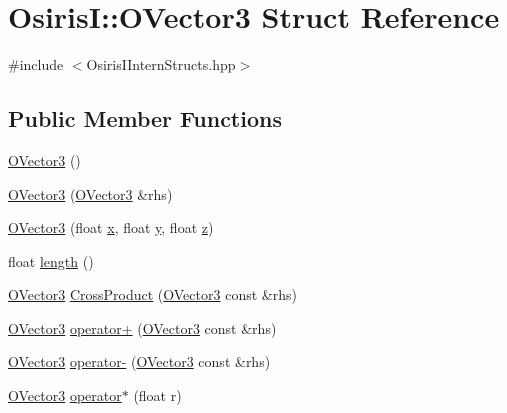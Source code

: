 \hypertarget{struct_osiris_i_1_1_o_vector3}{\section{Osiris\-I\-:\-:O\-Vector3 Struct Reference}
\label{struct_osiris_i_1_1_o_vector3}
}


{\ttfamily \#include $<$Osiris\-I\-Intern\-Structs.\-hpp$>$}

\subsection*{Public Member Functions}
\begin{DoxyCompactItemize}
\item 
\hyperlink{struct_osiris_i_1_1_o_vector3_ae9ea99bb61e223efabb6304c63caa5c9}{O\-Vector3} ()
\item 
\hyperlink{struct_osiris_i_1_1_o_vector3_ab8c2f1d7177080985eab662022b9b68e}{O\-Vector3} (\hyperlink{struct_osiris_i_1_1_o_vector3}{O\-Vector3} \&rhs)
\item 
\hyperlink{struct_osiris_i_1_1_o_vector3_a1a7728527eccb7ea5baf328e96ba1de7}{O\-Vector3} (float \hyperlink{struct_osiris_i_1_1_o_vector3_ade9127a381a17e7e24e72ea2eb213567}{x}, float \hyperlink{struct_osiris_i_1_1_o_vector3_a2973d21ed51744427fdc19ad02fec072}{y}, float \hyperlink{struct_osiris_i_1_1_o_vector3_acf11c02daf7508484ead1bd9329d30bf}{z})
\item 
float \hyperlink{struct_osiris_i_1_1_o_vector3_af0f99ab4c8d565c6b0551b1c4303c22a}{length} ()
\item 
\hyperlink{struct_osiris_i_1_1_o_vector3}{O\-Vector3} \hyperlink{struct_osiris_i_1_1_o_vector3_a4a8b6122cc6c8083a4b03bd5a9a20c58}{Cross\-Product} (\hyperlink{struct_osiris_i_1_1_o_vector3}{O\-Vector3} const \&rhs)
\item 
\hyperlink{struct_osiris_i_1_1_o_vector3}{O\-Vector3} \hyperlink{struct_osiris_i_1_1_o_vector3_a92d4a4f87edaabb36c404935435cf276}{operator+} (\hyperlink{struct_osiris_i_1_1_o_vector3}{O\-Vector3} const \&rhs)
\item 
\hyperlink{struct_osiris_i_1_1_o_vector3}{O\-Vector3} \hyperlink{struct_osiris_i_1_1_o_vector3_acc5119ff5e4306875f00d1e8841c2cd0}{operator-\/} (\hyperlink{struct_osiris_i_1_1_o_vector3}{O\-Vector3} const \&rhs)
\item 
\hyperlink{struct_osiris_i_1_1_o_vector3}{O\-Vector3} \hyperlink{struct_osiris_i_1_1_o_vector3_a79deb0c3b717e0fb71bab2d7c99f6939}{operator$\ast$} (float r)

\end{DoxyCompactItemize}
